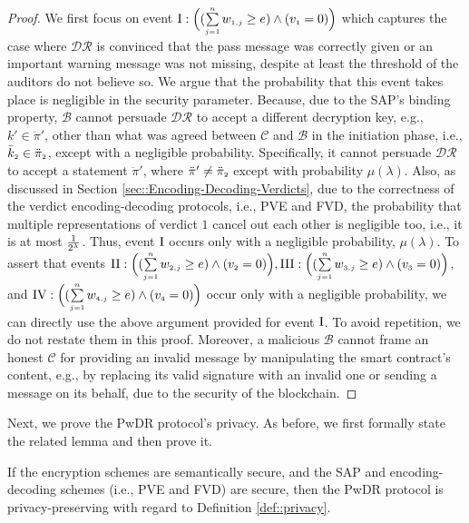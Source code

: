 \begin{proof}
%
We first focus on event $\text{\MakeUppercase{\romannumeral 1}}: \Big( (\sum\limits_{\st j=1}^{\st n}w_{\st 1,j}\geq e) \wedge ( v_{\st 1}=0)\Big)$ which captures the case where  $\mathcal{DR}$ is convinced that the pass message was correctly given or an important warning message was not missing, despite at least the threshold of the auditors do not believe so. We argue that the probability that this event takes place is negligible in the security parameter. Because, due to the SAP's binding property, $\mathcal{B}$  cannot persuade $\mathcal{DR}$ to accept a different decryption key, e.g., $k'\in \ddot\pi'$, other than what was agreed between $\mathcal{C}$ and $\mathcal{B}$ in the initiation phase, i.e., $\bar k_{\scriptscriptstyle 2}\in \ddot\pi_{\scriptscriptstyle 2}$, except with a negligible probability. Specifically, it cannot persuade  $\mathcal{DR}$ to accept a statement $\ddot \pi'$, where $\ddot \pi'\neq \ddot \pi_{\scriptscriptstyle 2}$ except with   probability $\mu(\lambda)$. Also, as discussed in Section \ref{sec::Encoding-Decoding-Verdicts}, due to the correctness of the verdict encoding-decoding protocols, i.e., PVE and FVD, the probability that multiple representations of verdict  $1$ cancel out each other is negligible too, i.e., it is at most $\frac{1}{2^{\scriptscriptstyle \lambda}}$. Thus,  event $\text{\MakeUppercase{\romannumeral 1}}$ occurs only with a negligible probability, $\mu(\lambda)$. To  assert that   events $\text{\MakeUppercase{\romannumeral 2}}: \Big(( \sum\limits_{\st j=1}^{\st n}w_{\st 2,j}\geq e) \wedge ( v_{\st 2}=0)\Big), \text{\MakeUppercase{\romannumeral 3}}: \Big(( \sum\limits_{\st j=1}^{\st n}w_{\st 3,j}\geq e) \wedge ( v_{\st 3}=0)\Big)$, and $\text{\MakeUppercase{\romannumeral 4}}: \Big(( \sum\limits_{\st j=1}^{\st n}w_{\st 4,j}\geq e) \wedge ( v_{\st 4}=0)\Big)$ occur only with a  negligible probability, we can directly use the above argument provided for event $\text{\MakeUppercase{\romannumeral 1}}$. To avoid repetition, we do not restate them in this proof.  Moreover, a malicious $\mathcal{B}$ cannot frame an honest $\mathcal{C}$ for providing an invalid message by manipulating the smart contract’s content,  e.g., by replacing its valid signature with an invalid one or sending a message on its behalf, due to the security of the blockchain.
\end{proof}


Next, we prove the PwDR protocol's privacy. As before, we first formally state the related lemma and then prove it. 


\begin{lemma}\label{lemma::privacy}
If the encryption schemes are semantically secure, and the SAP and encoding-decoding schemes (i.e., PVE and FVD)  are secure, then the PwDR protocol is privacy-preserving with regard to Definition \ref{def::privacy}.  
\end{lemma}

